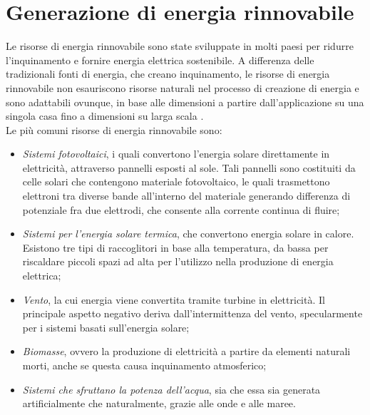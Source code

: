 \section{Generazione di energia rinnovabile}
Le risorse di energia rinnovabile sono state sviluppate in molti paesi per ridurre l'inquinamento e fornire energia elettrica sostenibile. A differenza delle tradizionali fonti di energia, che creano inquinamento, le risorse di energia rinnovabile non esauriscono risorse naturali nel processo di creazione di energia e sono adattabili ovunque, in base alle dimensioni a partire dall'applicazione su una singola casa fino a dimensioni su larga scala \cite{smartgrids}.
\\
Le più comuni risorse di energia rinnovabile sono:
\begin{itemize}
	\item \emph{Sistemi fotovoltaici}, i quali convertono l'energia solare direttamente in elettricità, attraverso pannelli esposti al sole. Tali pannelli sono costituiti da celle solari che contengono materiale fotovoltaico, le quali trasmettono elettroni tra diverse bande all'interno del materiale generando differenza di potenziale fra due elettrodi, che consente alla corrente continua di fluire;
	\item \emph{Sistemi per l'energia solare termica}, che convertono energia solare in calore. Esistono tre tipi di raccoglitori in base alla temperatura, da bassa per riscaldare piccoli spazi ad alta per l'utilizzo nella produzione di energia elettrica;
	\item \emph{Vento}, la cui energia viene convertita tramite turbine in elettricità. Il principale aspetto negativo deriva dall'intermittenza del vento, specularmente per i sistemi basati sull'energia solare;
	\item \emph{Biomasse}, ovvero la produzione di elettricità a partire da elementi naturali morti, anche se questa causa inquinamento atmosferico;
	\item \emph{Sistemi che sfruttano la potenza dell'acqua}, sia che essa sia generata artificialmente che naturalmente, grazie alle onde e alle maree.   
\end{itemize} 

